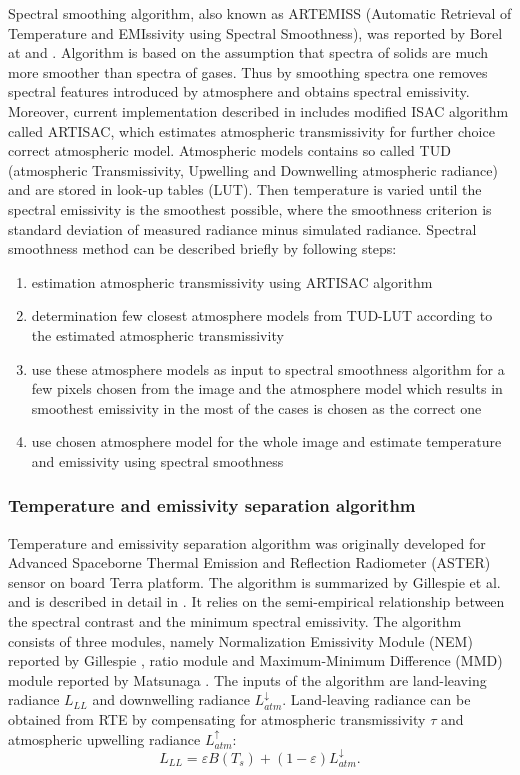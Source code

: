 Spectral smoothing algorithm, also known as ARTEMISS (Automatic Retrieval of Temperature and EMIssivity using Spectral Smoothness), was reported by Borel at \cite{B98} and \cite{B07}. Algorithm is based on the assumption that spectra of solids are much more smoother than spectra of gases. Thus by smoothing spectra one removes spectral features introduced by atmosphere and obtains spectral emissivity. Moreover, current implementation described in \cite{B07} includes modified ISAC algorithm called ARTISAC, which estimates atmospheric transmissivity for further choice correct atmospheric model. Atmospheric models contains so called TUD (atmospheric Transmissivity, Upwelling and Downwelling atmospheric radiance) and are stored in look-up tables (LUT). Then temperature is varied until the spectral emissivity is the smoothest possible, where the smoothness criterion is standard deviation of measured radiance minus simulated radiance. Spectral smoothness method can be described briefly by following steps:
\begin{enumerate}
	\item estimation atmospheric transmissivity using ARTISAC algorithm
	\item determination few closest atmosphere models from TUD-LUT according to the estimated atmospheric transmissivity
	\item use these atmosphere models as input to spectral smoothness algorithm for a few pixels chosen from the image and the atmosphere model which results in smoothest emissivity in the most of the cases is chosen as the correct one
	\item use chosen atmosphere model for the whole image and estimate temperature and emissivity using spectral smoothness
\end{enumerate}

\subsubsection*{Temperature and emissivity separation algorithm}

Temperature and emissivity separation algorithm was originally developed for Advanced Spaceborne Thermal Emission and Reflection Radiometer (ASTER) sensor on board Terra platform. The algorithm is summarized by Gillespie et al. \cite{GR98} and is described in detail in \cite{G99}. It relies on the semi-empirical relationship between the spectral contrast and the minimum spectral emissivity. The algorithm consists of three modules, namely Normalization Emissivity Module (NEM) reported by Gillespie \cite{G95}, ratio module and Maximum-Minimum Difference (MMD) module reported by Matsunaga \cite{M94}. The inputs of the algorithm are land-leaving radiance $L_{LL}$ and downwelling radiance $L^{\downarrow}_{atm}$. Land-leaving radiance can be obtained from RTE by compensating for atmospheric transmissivity $\tau$ and atmospheric upwelling radiance $L^{\uparrow}_{atm}$:
$$ L_{LL} = \varepsilon B(T_s) + (1 - \varepsilon) L^\downarrow_{atm}. $$

